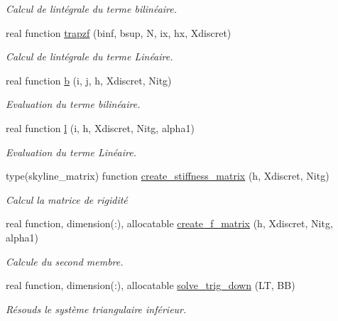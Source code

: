 \begin{DoxyCompactItemize}
\begin{DoxyCompactList}\small\item\em Calcul de l\textquotesingle{}intégrale du terme bilinéaire. \end{DoxyCompactList}\item 
real function \hyperlink{namespacesolver_adb6590794b23eaed708cd2e42adac550}{trapzf} (binf, bsup, N, ix, hx, Xdiscret)
\begin{DoxyCompactList}\small\item\em Calcul de l\textquotesingle{}intégrale du terme Linéaire. \end{DoxyCompactList}\item 
real function \hyperlink{namespacesolver_a99565d1c8ed5142211b78fe3ccca060b}{b} (i, j, h, Xdiscret, Nitg)
\begin{DoxyCompactList}\small\item\em Evaluation du terme bilinéaire. \end{DoxyCompactList}\item 
real function \hyperlink{namespacesolver_a327c990a10263590618db7a31c4edcc9}{l} (i, h, Xdiscret, Nitg, alpha1)
\begin{DoxyCompactList}\small\item\em Evaluation du terme Linéaire. \end{DoxyCompactList}\item 
type(skyline\+\_\+matrix) function \hyperlink{namespacesolver_aefd2f88bd66b9d9ccce170259a49c77d}{create\+\_\+stiffness\+\_\+matrix} (h, Xdiscret, Nitg)
\begin{DoxyCompactList}\small\item\em Calcul la matrice de rigidité \end{DoxyCompactList}\item 
real function, dimension(\+:), allocatable \hyperlink{namespacesolver_af45a5f246a818112e6a257335c2b829d}{create\+\_\+f\+\_\+matrix} (h, Xdiscret, Nitg, alpha1)
\begin{DoxyCompactList}\small\item\em Calcule du second membre. \end{DoxyCompactList}\item 
real function, dimension(\+:), allocatable \hyperlink{namespacesolver_ad8b8ef6c982475b3fb276f93660b750f}{solve\+\_\+trig\+\_\+down} (LT, BB)
\begin{DoxyCompactList}\small\item\em Résouds le système triangulaire inférieur. \end{DoxyCompactList}\item 

\end{DoxyCompactItemize}
